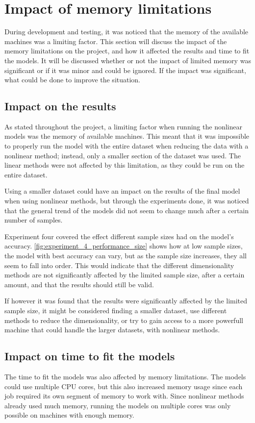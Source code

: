 \section{Impact of memory limitations}\label{sec:impact_of_memory_limitations}
During development and testing, it was noticed that the memory of the available machines was a limiting factor. This section will discuss the impact of the memory limitations on the project, and how it affected the results and time to fit the models. It will be discussed whether or not the impact of limited memory was significant or if it was minor and could be ignored. If the impact was significant, what could be done to improve the situation.


\subsection{Impact on the results}\label{subsec:impact_on_results}
As stated throughout the project, a limiting factor when running the nonlinear models was the memory of available machines. This meant that it was impossible to properly run the model with the entire dataset when reducing the data with a nonlinear method; instead, only a smaller section of the dataset was used. The linear methods were not affected by this limitation, as they could be run on the entire dataset.

Using a smaller dataset could have an impact on the results of the final model when using nonlinear methods, but through the experiments done, it was noticed that the general trend of the models did not seem to change much after a certain number of samples.

Experiment four covered the effect different sample sizes had on the model's accuracy. \autoref{fig:experiment_4_performance_size} shows how at low sample sizes, the model with best accuracy can vary, but as the sample size increases, they all seem to fall into order. This would indicate that the different dimensionality methods are not significantly affected by the limited sample size, after a certain amount, and that the results should still be valid.

If however it was found that the results were significantly affected by the limited sample size, it might be considered finding a smaller dataset, use different methods to reduce the dimensionality, or try to gain access to a more powerfull machine that could handle the larger datasets, with nonlinear methods.


\subsection{Impact on time to fit the models}\label{subsec:impact_on_time_to_fit_the_models}
The time to fit the models was also affected by memory limitations. The models could use multiple CPU cores, but this also increased memory usage since each job required its own segment of memory to work with. Since nonlinear methods already used much memory, running the models on multiple cores was only possible on machines with enough memory.

